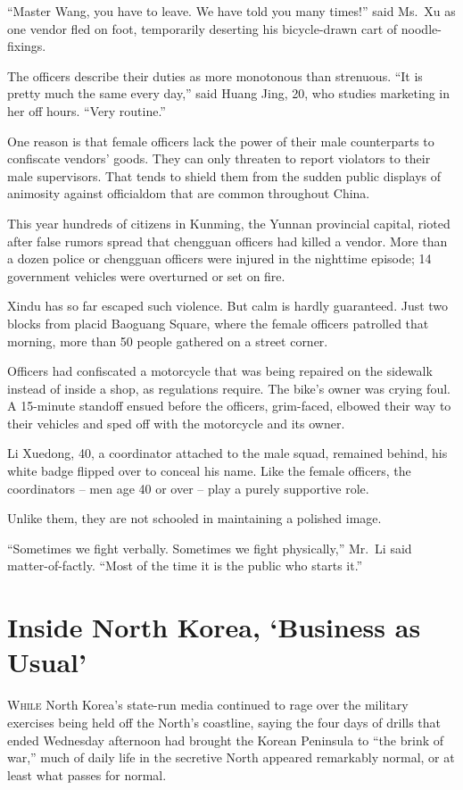 ﻿\documentclass[12pt]{article}
\begin{document}
``Master Wang, you have to leave. We have told you many times!'' said Ms.~Xu as one vendor fled on
foot, temporarily deserting his bicycle-drawn cart of noodle-fixings.

The officers describe their duties as more monotonous than strenuous. ``It is pretty much the same
every day,'' said Huang Jing, 20, who studies marketing in her off hours. ``Very routine.''

One reason is that female officers lack the power of their male counterparts to confiscate vendors'
goods. They can only threaten to report violators to their male supervisors. That tends to shield
them from the sudden public displays of animosity against officialdom that are common throughout
China.

This year hundreds of citizens in Kunming, the Yunnan provincial capital, rioted after false rumors
spread that chengguan officers had killed a vendor. More than a dozen police or chengguan officers
were injured in the nighttime episode; 14 government vehicles were overturned or set on fire.

Xindu has so far escaped such violence. But calm is hardly guaranteed. Just two blocks from placid
Baoguang Square, where the female officers patrolled that morning, more than 50 people gathered on a
street corner.

Officers had confiscated a motorcycle that was being repaired on the sidewalk instead of inside a
shop, as regulations require. The bike's owner was crying foul. A 15-minute standoff ensued before
the officers, grim-faced, elbowed their way to their vehicles and sped off with the motorcycle and
its owner.

Li Xuedong, 40, a coordinator attached to the male squad, remained behind, his white badge flipped
over to conceal his name. Like the female officers, the coordinators -- men age 40 or over -- play a
purely supportive role.

Unlike them, they are not schooled in maintaining a polished image.

``Sometimes we fight verbally. Sometimes we fight physically,'' Mr.~Li said matter-of-factly. ``Most
of the time it is the public who starts it.''

\section{Inside North Korea, `Business as Usual'}

\lettrine{W}{hile} North Korea's state-run media continued to rage over the
military exercises being held off the North's coastline, saying the four days of drills that ended
Wednesday afternoon had brought the Korean Peninsula to ``the brink of war,'' much of daily life in
the secretive North appeared remarkably normal, or at least what passes for normal.
\end{document}
